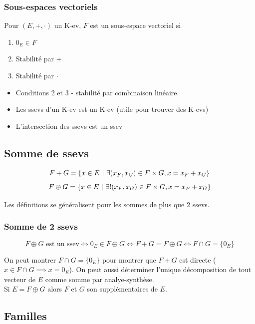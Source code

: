 \documentclass[openany]{book}
\begin{document}
\subsubsection{Sous-espaces vectoriels}
Pour $ (E, +, \cdot) $ un K-ev, $F$ est un sous-espace vectoriel si
\begin{enumerate}
    \item $0_E \in F$
    \item Stabilité par $+$
    \item Stabilité par $\cdot$
\end{enumerate}

\begin{itemize}
    \item Conditions 2 et 3 - stabilité par combinaison linéaire.
    \item Les ssevs d'un K-ev est un K-ev (utile pour trouver des K-evs)
    \item L'intersection des ssevs est un ssev
\end{itemize}

\subsection{Somme de ssevs}
\[ F + G = \{ x \in E \text{ } | \text{ } \exists(x_F, x_G) \in F \times G, x = x_F + x_G \} \]
\[ F \oplus G = \{ x \in E \text{ } | \text{ } \exists!(x_F, x_G) \in F \times G, x = x_F + x_G \} \]

Les définitions se généralisent pour les sommes de plus que 2 ssevs.

\subsubsection{Somme de 2 ssevs}

\[ F \oplus G \text{ est un ssev} \iff 0_E \in F \oplus G \iff F + G = F \oplus G \iff F \cap G = \{0_E\} \]

On peut montrer $ F \cap G = \{0_E\} $ pour montrer que $F+G$ est directe ($x \in F \cap G \implies x = 0_E $). On peut aussi déterminer l'unique décomposition de tout vecteur de $E$ comme somme par analye-synthèse. \\

Si $E = F\oplus G$ alors $F$ et $G$ son supplémentaires de $E$.

\subsection{Familles}
\end{document}
